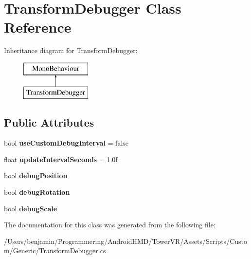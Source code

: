 \hypertarget{class_transform_debugger}{}\section{Transform\+Debugger Class Reference}
\label{class_transform_debugger}
Inheritance diagram for Transform\+Debugger\+:\begin{figure}[H]
\begin{center}
\leavevmode
\includegraphics[height=2.000000cm]{class_transform_debugger}
\end{center}
\end{figure}
\subsection*{Public Attributes}
\begin{DoxyCompactItemize}
\item 
bool {\bfseries use\+Custom\+Debug\+Interval} = false\hypertarget{class_transform_debugger_aaf06d9c33dc9447d44bb7449ecf2c141}{}\label{class_transform_debugger_aaf06d9c33dc9447d44bb7449ecf2c141}

\item 
float {\bfseries update\+Interval\+Seconds} = 1.\+0f\hypertarget{class_transform_debugger_a73ef663cb15c97e23c7c64062909a3a2}{}\label{class_transform_debugger_a73ef663cb15c97e23c7c64062909a3a2}

\item 
bool {\bfseries debug\+Position}\hypertarget{class_transform_debugger_ad1f6c8c9bcb39453ce66aaa3d3568421}{}\label{class_transform_debugger_ad1f6c8c9bcb39453ce66aaa3d3568421}

\item 
bool {\bfseries debug\+Rotation}\hypertarget{class_transform_debugger_ad32a74a860e5d8dbfcf5e25e968115f9}{}\label{class_transform_debugger_ad32a74a860e5d8dbfcf5e25e968115f9}

\item 
bool {\bfseries debug\+Scale}\hypertarget{class_transform_debugger_a1a2e3f97f561dcb247d6eddaae0fc585}{}\label{class_transform_debugger_a1a2e3f97f561dcb247d6eddaae0fc585}

\end{DoxyCompactItemize}


The documentation for this class was generated from the following file\+:\begin{DoxyCompactItemize}
\item 
/\+Users/benjamin/\+Programmering/\+Android\+H\+M\+D/\+Tower\+V\+R/\+Assets/\+Scripts/\+Custom/\+Generic/Transform\+Debugger.\+cs\end{DoxyCompactItemize}
